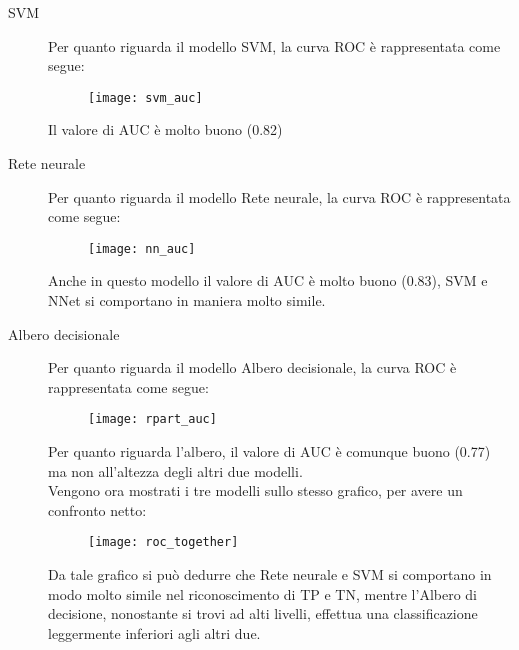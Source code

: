 \begin{description}
	\item [SVM] Per quanto riguarda il modello SVM, la curva ROC è rappresentata come segue:
	\begin{figure}[H]
		\centering
		\texttt{[image: svm\_auc]}	
	\end{figure}
	Il valore di AUC è molto buono (0.82)
	
	\item [Rete neurale] Per quanto riguarda il modello Rete neurale, la curva ROC è rappresentata come segue:
	\begin{figure}[H]
		\centering
		\texttt{[image: nn\_auc]}	
	\end{figure}
	Anche in questo modello il valore di AUC è molto buono (0.83), SVM e NNet si comportano in maniera molto simile.
	
	\item [Albero decisionale] Per quanto riguarda il modello Albero decisionale, la curva ROC è rappresentata come segue:
	\begin{figure}[H]
		\centering
		\texttt{[image: rpart\_auc]}	
	\end{figure}
	Per quanto riguarda l'albero, il valore di AUC è comunque buono (0.77) ma non all'altezza degli altri due modelli.\\
	Vengono ora mostrati i tre modelli sullo stesso grafico, per avere un confronto netto:
	
	\begin{figure}[H]
		\centering
		\texttt{[image: roc\_together]}	
	\end{figure}

	
	Da tale grafico si può dedurre che Rete neurale e SVM si comportano in modo molto simile nel riconoscimento di TP e TN, mentre l'Albero di decisione, nonostante si trovi ad alti livelli, effettua una classificazione leggermente inferiori agli altri due.
	
	
	
\end{description}










